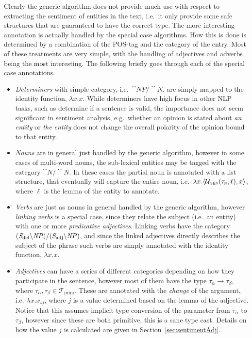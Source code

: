 Clearly the generic algorithm does not provide much use with respect to extracting the sentiment of entities in the text, i.e.\ it only provide some safe structures that are guaranteed to have the correct type. The more interesting annotation is actually handled by the special case algorithms. How this is done is determined by a combination of the POS-tag and the category of the entry. Most of these treatments are very simple, with the handling of adjectives and adverbs being the most interesting. The following briefly goes through each of the special case annotations.

\begin{itemize}
	\item \emph{Determiners} with simple category, i.e.\ $\cat{NP}/\cat{N}$, are simply mapped to the identity function, $\lambda x.x$.
	While determiners have high focus in other NLP tasks, such as determine if a sentence is valid, the importance does not seem significant in sentiment analysis, e.g.\ whether an opinion is stated about \emph{an entity} or \emph{the entity} does not change the overall polarity of the opinion bound to that entity.

	\item \emph{Nouns} are in general just handled by the generic algorithm, however in some cases of multi-word nouns, the sub-lexical entities may be tagged with the category $\cat{N}/\cat{N}$. In these cases the partial noun is annotated with a list structure, that eventually will capture the entire noun, i.e.\ $\lambda x.\langle \mathcal{U}_\textsc{gen}(\tau_\textsc{n}, \ell), x\rangle$, where $\ell$ is the lemma of the entity to annotate.

	\item \emph{Verbs} are just as nouns in general handled by the generic algorithm, however \emph{linking verbs} is a special case, since they relate the subject (i.e.\ an entity) with one or more \emph{predicative adjectives}. Linking verbs have the category $({\mathit{S}}_\mathrm{dcl} \backslash {\mathit{NP}})/({\mathit{S}}_\mathrm{adj} \backslash {\mathit{NP}})$, and since the linked adjectives directly describes the subject of the phrase such verbs are simply annotated with the identity function, $\lambda x.x$. 

	\item \emph{Adjectives} can have a series of different categories depending on how they participate in the sentence, however most of them have the type $\tau_\alpha \to \tau_\beta$, where $\tau_\alpha, \tau_\beta \in \mathcal{T}_\mathrm{prim}$. These are annotated with the \emph{change} of the argument, i.e. $\lambda x.x_{\circ j}$, where $j$ is a value determined based on the lemma of the adjective. Notice that this assumes implicit type conversion of the parameter from $\tau_\alpha$ to $\tau_\beta$, however since these are both primitive, this is a sane type cast. Details on how the value $j$ is calculated are given in Section~\ref{sec:sentimentAdj}.


\end{itemize}
